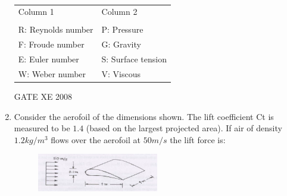 \documentclass[12pt]{article}
\begin{document}
\begin{enumerate}[label=Q\arabic*.]
\begin{table}[H]     \centering     \caption{}     \label{}     \begin{tabular}{l   l}
    Column 1 & Column 2 \\
      &  \\
   R: Reynolds number & P: Pressure\\
F: Froude number & G: Gravity\\
E: Euler number & S: Surface tension\\
W: Weber number & V: Viscous\\
\end{tabular} \end{table}

\begin{enumerate}[label=(\Alph*)]
\end{enumerate}


GATE XE 2008
\item  Consider the aerofoil of the dimensions shown. The lift coefficient Ct is measured to be $1.4$ (based on the largest projected area). If air of density $1.2 kg/m^3$ flows over the aerofoil at $50 m/s$ the lift force is:

\begin{figure}[H]
\centering
  \includegraphics[width=0.5\textwidth]{figs/ass1_d_q14.png}
  \caption{}
\end{figure} 

\begin{enumerate}[label=(\Alph*)]
\end{enumerate}


\end{enumerate}
\end{document}
